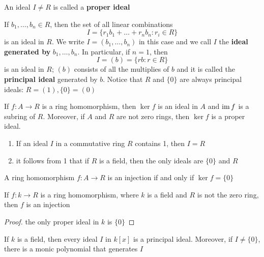\documentclass[11pt]{article}
\begin{document}
An ideal \(I\neq R\) is called a \textbf{proper ideal}

\begin{examplle}[]
If \(b_1,\dots,b_n\in R\), then the set of all linear combinations
\begin{equation*}
I=\{r_1b_1+\dots+r_nb_n:r_i\in R\}
\end{equation*}
is an ideal in \(R\). We write \(I=(b_1,\dots,b_n)\) in this case and we call
\(I\) the \textbf{ideal generated by} \(b_1,\dots,b_n\). In particular, if \(n=1\), then
\begin{equation*}
I=(b)=\{rb:r\in R\}
\end{equation*}
is an ideal in \(R\); \((b)\) consists of all the multiplies of \(b\) and it is
called the \textbf{principal ideal} generated by \(b\). Notice that \(R\) and \(\{0\}\) are
always principal ideals: \(R=(1),\{0\}=(0)\)
\end{examplle}


\begin{proposition}[]
If \(f:A\to R\) is a ring homomorphism, then \(\ker f\) is an ideal in \(A\)
and \(\operatorname{im} f\) is a subring of \(R\). Moreover, if \(A\) and \(R\) are not zero rings,
then \(\ker f\) is a proper ideal.
\end{proposition}

\begin{examplle}[]
\begin{enumerate}
\item If an ideal \(I\) in a commutative ring \(R\) contains 1, then \(I=R\)
\item it follows from 1 that if \(R\) is a field, then the only ideals are \(\{0\}\)
and \(R\)
\end{enumerate}
\end{examplle}

\begin{proposition}[]
A ring homomorphism \(f:A \to R\) is an injection if and only if \(\ker f=\{0\}\)
\end{proposition}

\begin{corollary}[]
If \(f:k\to R\) is a ring homomorphism, where \(k\) is a field and \(R\) is not the
zero ring, then \(f\) is an injection
\end{corollary}

\begin{proof}
the only proper ideal in \(k\) is \(\{0\}\)
\end{proof}

\begin{theorem}[]
If \(k\) is a field, then every ideal \(I\) in \(k[x]\) is a principal ideal.
Moreover, if \(I\neq\{0\}\), there is a monic polynomial that generates \(I\)
\end{theorem}
\end{document}
